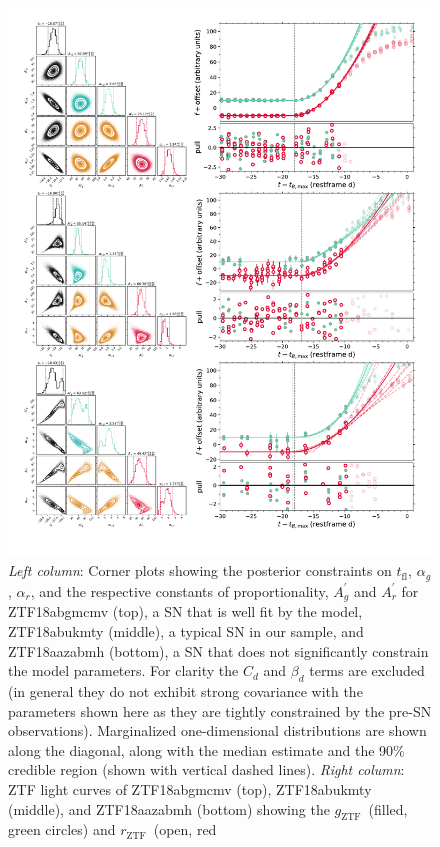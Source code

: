 \documentclass[twocolumn]{./aastex63}
\newcommand{\rztf}{$r_\mathrm{ZTF}$}
\newcommand{\gztf}{$g_\mathrm{ZTF}$}
\newcommand{\tfl}{$t_\mathrm{fl}$}
\begin{document}
\begin{figure}
    \centering
    \includegraphics[width=5.75in]{./figures/corner_LC.pdf}
    \caption{\textit{Left column}: Corner plots showing the posterior
    constraints on \tfl, $\alpha_g$, $\alpha_r$, and the respective constants
    of proportionality, $A_g^\prime$ and $A_r^\prime$ for ZTF18abgmcmv (top),
    a SN that is well fit by the model, ZTF18abukmty (middle), a typical SN in
    our sample, and ZTF18aazabmh (bottom), a SN that does not significantly
    constrain the model parameters. For clarity the $C_d$ and $\beta_d$ terms
    are excluded (in general they do not exhibit strong covariance with the
    parameters shown here as they are tightly constrained by the pre-SN
    observations). Marginalized one-dimensional distributions are shown along
    the diagonal, along with the median estimate and the 90\% credible region
    (shown with vertical dashed lines). \textit{Right column}: ZTF light
    curves of ZTF18abgmcmv (top), ZTF18abukmty (middle), and ZTF18aazabmh
    (bottom) showing the \gztf\ (filled, green circles) and \rztf\ (open, red
}
\end{figure}
\end{document}
